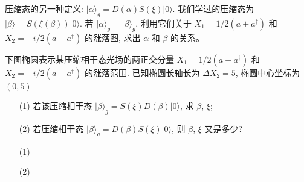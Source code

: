 \documentclass{assignment}
\begin{document}
\begin{prob}
    压缩态的另一种定义: $\lvert\alpha\rangle_g=D(\alpha)S(\xi)\lvert 0\rangle$. 我们学过的压缩态为 $\lvert\beta\rangle=S(\xi(\beta))\lvert 0\rangle$. 若 $\lvert\alpha\rangle_g=\lvert\beta\rangle_g$, 利用它们关于 $X_1=1/2(a+a^{\dagger})$ 和 $X_2=-i/2(a-a^{\dagger})$ 的涨落图, 求出 $\alpha$ 和 $\beta$ 的关系。
\end{prob}
\begin{sol}
    
\end{sol}

\begin{prob}
    下图椭圆表示某压缩相干态光场的两正交分量 $X_1=1/2(a+a^{\dagger})$ 和 $X_2=-i/2(a-a^{\dagger})$ 的涨落范围. 已知椭圆长轴长为 $\Delta X_2=5$, 椭圆中心坐标为 $(0,5)$
    \begin{itemize}
        \item[(1)] 若该压缩相干态 $\lvert\beta\rangle_g=S(\xi)D(\beta)\lvert 0\rangle$, 求 $\beta$, $\xi$;
        \item[(2)] 若压缩相干态 $\lvert\beta\rangle_g=D(\beta)S(\xi)\lvert 0\rangle$, 则 $\beta$, $\xi$ 又是多少?
    \end{itemize}
\end{prob}
\begin{sol}
    \begin{itemize}
        \item[(1)] 
        \item[(2)] 
    \end{itemize}
\end{sol}
\end{document}
